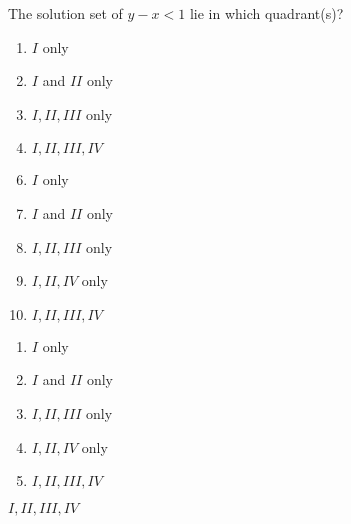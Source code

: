 


  The solution set of $y-x<1$ lie in which quadrant(s)? %


\ifsat
	\begin{enumerate}[label=\Alph*)]
		\item   $I$ only
		\item  $I$ and $II$ only
		\item  $I,II,III$ only
		\item  $I,II, III,IV$%
	\end{enumerate}
\else
\fi

\ifacteven
	\begin{enumerate}[label=\textbf{\Alph*.},itemsep=\fill,align=left]
		\setcounter{enumii}{5}
		\item   $I$ only
		\item  $I$ and $II$ only
		\item  $I,II,III$ only
		\addtocounter{enumii}{1}
		\item  $I,II,IV$ only
		\item  $I,II, III,IV$%
	\end{enumerate}
\else
\fi

\ifactodd
	\begin{enumerate}[label=\textbf{\Alph*.},itemsep=\fill,align=left]
		\item   $I$ only
		\item  $I$ and $II$ only
		\item  $I,II,III$ only
		\item  $I,II,IV$ only
		\item  $I,II, III,IV$%
	\end{enumerate}
\else
\fi

\ifgridin
  $I,II, III,IV$%

\else
\fi

